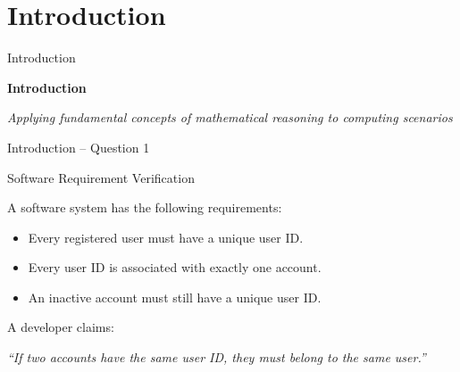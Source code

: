 
\section{Introduction}


\begin{frame}{Introduction}

\begin{center}

\vspace{1cm}

{\Huge\textbf{Introduction}}

\vspace{0.6cm}

\textit{Applying fundamental concepts of mathematical reasoning to
computing scenarios}

\end{center}

\end{frame}


\begin{frame}{Introduction -- Question 1}

\begin{block}{Software Requirement Verification}

A software system has the following requirements:

\begin{itemize}
    \item Every registered user must have a unique user ID.
    \item Every user ID is associated with exactly one account.
    \item An inactive account must still have a unique user ID.
\end{itemize}

A developer claims:

\begin{center}
\textit{``If two accounts have the same user ID, they must belong to the same user.''}
\end{center}

\end{block}

\end{frame}

